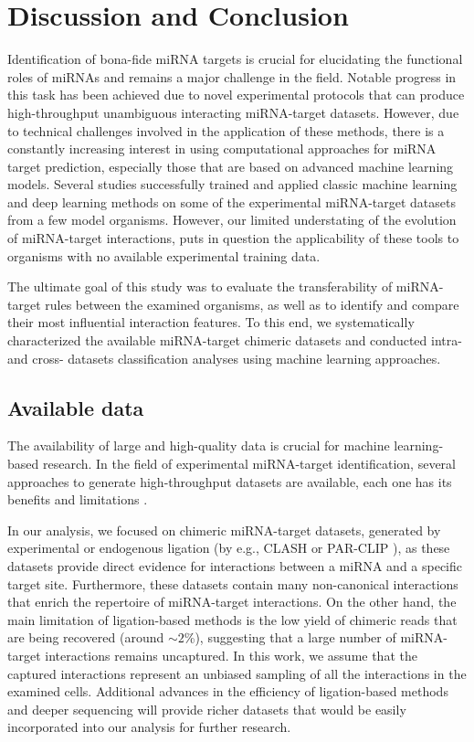 \chapter{Discussion and Conclusion}
\label{chap:conclusion}
Identification of bona-fide miRNA targets is crucial for elucidating the functional roles of miRNAs and remains a major challenge in the field. Notable progress in this task has been achieved due to novel experimental protocols that can produce high-throughput unambiguous interacting miRNA-target datasets. However, due to technical challenges involved in the application of these methods, there is a constantly increasing interest in using computational approaches for miRNA target prediction, especially those that are based on advanced machine learning models. Several studies successfully trained and applied classic machine learning \cite{lu2016learning, ding2016tarpmir, wang2016improving, liu2019prediction} and deep learning \cite{wen2018deepmirtar, paker2019mirlstm, pla2018miraw} methods on some of the experimental miRNA-target datasets from a few model organisms. However, our limited understating of the evolution of miRNA-target interactions, puts in question the applicability of these tools to organisms with no available experimental training data.

The ultimate goal of this study was to evaluate the transferability of miRNA-target rules between the examined organisms, as well as to identify and compare their most influential interaction features. To this end, we systematically characterized the available miRNA-target chimeric datasets and conducted intra- and cross- datasets classification analyses using machine learning approaches.  

\section{Available data}
The availability of large and high-quality data is crucial for machine learning-based research. In the field of experimental miRNA-target identification, several approaches to generate high-throughput datasets are available, each one has its benefits and limitations \cite{li2019current, martinez2013microrna}. 

In our analysis, we focused on chimeric miRNA-target datasets, generated by experimental or endogenous ligation (by e.g., CLASH \cite{helwak2013mapping} or PAR-CLIP \cite{grosswendt2014unambiguous}), as these datasets provide direct evidence for interactions between a miRNA and a specific target site. Furthermore, these datasets contain many non-canonical interactions that enrich the repertoire of miRNA-target interactions. On the other hand, the main limitation of ligation-based methods is the low yield of chimeric reads that are being recovered (around $\sim 2$\%), suggesting that a large number of miRNA-target interactions remains uncaptured. In this work, we assume that the captured interactions represent an unbiased sampling of all the interactions in the examined cells. Additional advances in the efficiency of ligation-based methods and deeper sequencing will provide richer datasets that would be easily incorporated into our analysis for further research.  

